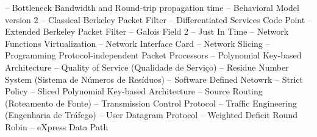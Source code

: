 \begin{siglas}
   -- Bottleneck Bandwidth and Round-trip propagation time
   -- Behavioral Model version 2
   -- Classical Berkeley Packet Filter
   -- Differentiated Services Code Point
   -- Extended Berkeley Packet Filter
   -- Galois Field 2
   -- Just In Time
   -- Network Functions Virtualization
   -- Network Interface Card
   -- Network Slicing
    -- Programming Protocol-independent Packet Processors
   --  Polynomial Key-based Architecture
   -- Quality of Service (Qualidade de Serviço)
   -- Residue Number System (Sistema de Números de Resíduos)
   -- Software Defined Netowrk
   -- Strict Policy
   --  Sliced Polynomial Key-based Architecture
   -- Source Routing (Roteamento de Fonte)
   -- Transmission Control Protocol
   -- Traffic Engineering (Engenharia de Tráfego)
   -- User Datagram Protocol
   -- Weighted Deficit Round Robin
   -- eXpress Data Path
\end{siglas}